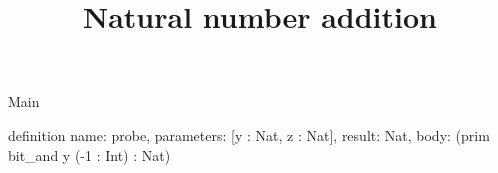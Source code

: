 \begin{lexlean}{Main}
\title{Natural number addition}
\begin{semanticmodule}
definition{
  name: probe,
  parameters: [y : Nat, z : Nat],
  result: Nat,
  body: (prim bit_and y (-1 : Int) : Nat)
}
\end{semanticmodule}
\end{lexlean}
